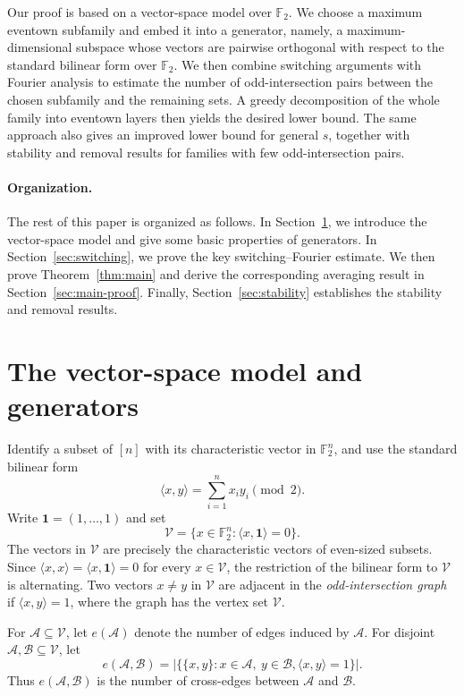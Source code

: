 \documentclass[11pt]{article}
\newcommand{\one}{\mathbf 1}
\begin{document}
Our proof is based on a vector-space model over \(\mathbb F_2\). We choose
a maximum eventown subfamily and embed it into a generator, namely, a
maximum-dimensional subspace whose vectors are pairwise orthogonal with
respect to the standard bilinear form over \(\mathbb F_2\). We then combine
switching arguments with Fourier analysis to estimate the number of
odd-intersection pairs between the chosen subfamily and the remaining sets.
A greedy decomposition of the whole family into eventown layers then yields
the desired lower bound. The same approach also gives an improved lower
bound for general \(s\), together with stability and removal results for
families with few odd-intersection pairs.

\paragraph{Organization.} The rest of this paper is organized as follows. In Section~\ref{sec:model}, we introduce the vector-space model and give some basic properties of generators.
In Section~\ref{sec:switching}, we prove the key switching--Fourier estimate. We then prove Theorem~\ref{thm:main} and derive the corresponding averaging result in Section~\ref{sec:main-proof}. Finally, Section~\ref{sec:stability} establishes the stability and removal results.


\section{The vector-space model and generators}\label{sec:model}

Identify a subset of \([n]\) with its characteristic vector in
\(\mathbb F_2^n\), and use the standard bilinear form
\[
 \langle x,y\rangle=\sum_{i=1}^n x_i y_i\pmod 2.
\]
Write $\one=(1,\dots,1)$ and set
\[
 \mathcal V=\{x\in\mathbb F_2^n:\langle x,\one\rangle=0\}.
\]
The vectors in \(\mathcal V\) are precisely the characteristic vectors of
even-sized subsets.  Since
\(\langle x,x\rangle=\langle x,\one\rangle=0\) for every
\(x\in\mathcal V\), the restriction of the bilinear form to
\(\mathcal V\) is alternating.  Two vectors \(x\ne y\) in \(\mathcal V\) are adjacent in the
\emph{odd-intersection graph} if \(\langle x,y\rangle=1\), where the graph has the vertex set \(\mathcal V\).

For \(\mathcal A\subseteq\mathcal V\), let \(e(\mathcal A)\) denote the
number of edges induced by \(\mathcal A\).  For disjoint
\(\mathcal A,\mathcal B\subseteq\mathcal V\), let
\[
 e(\mathcal A,\mathcal B)
 =
 \bigl|\{\{x,y\}:x\in\mathcal A,\ y\in\mathcal B,
          \langle x,y\rangle=1\}\bigr|.
\]
Thus \(e(\mathcal A,\mathcal B)\) is the number of cross-edges between
\(\mathcal A\) and \(\mathcal B\).
\end{document}
